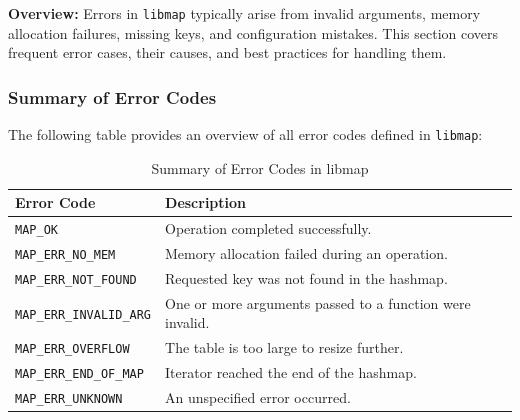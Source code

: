 \documentclass[titlepage]{article}
\begin{document}
\textbf{Overview:}
Errors in \texttt{libmap} typically arise from invalid arguments, memory allocation failures, missing keys, and configuration mistakes. This section covers frequent error cases, their causes, and best practices for handling them.

\subsubsection{Summary of Error Codes}

The following table provides an overview of all error codes defined in \texttt{libmap}:

\begin{table}[h]
    \centering
    \renewcommand{\arraystretch}{1.3}
    \begin{tabular}{@{} l p{8cm} @{}}
        \toprule
        \textbf{Error Code} & \textbf{Description} \\
        \midrule
        \texttt{MAP\_OK} & Operation completed successfully. \\
        \texttt{MAP\_ERR\_NO\_MEM} & Memory allocation failed during an operation. \\
        \texttt{MAP\_ERR\_NOT\_FOUND} & Requested key was not found in the hashmap. \\
        \texttt{MAP\_ERR\_INVALID\_ARG} & One or more arguments passed to a function were invalid. \\
        \texttt{MAP\_ERR\_OVERFLOW} & The table is too large to resize further. \\
        \texttt{MAP\_ERR\_END\_OF\_MAP} & Iterator reached the end of the hashmap. \\
        \texttt{MAP\_ERR\_UNKNOWN} & An unspecified error occurred. \\
        \bottomrule
    \end{tabular}
    \caption{Summary of Error Codes in libmap}
\end{table}
\end{document}
